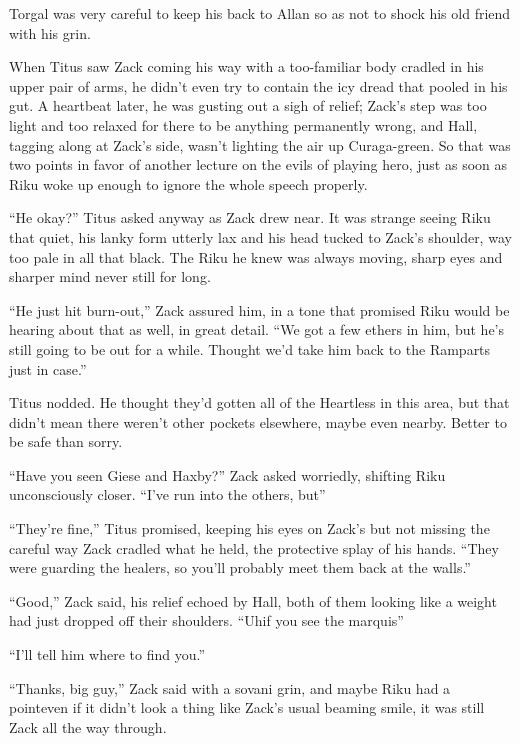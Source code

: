 Torgal was very careful to keep his back to Allan so as not to shock his old friend with his grin.


\scenechange


When Titus saw Zack coming his way with a too-familiar body cradled in his upper pair of arms, he didn't even try to contain the icy dread that pooled in his gut. A heartbeat later, he was gusting out a sigh of relief; Zack's step was too light and too relaxed for there to be anything permanently wrong, and Hall, tagging along at Zack's side, wasn't lighting the air up Curaga-green. So that was two points in favor of another lecture on the evils of playing hero, just as soon as Riku woke up enough to ignore the whole speech properly.

``He okay?'' Titus asked anyway as Zack drew near. It was strange seeing Riku that quiet, his lanky form utterly lax and his head tucked to Zack's shoulder, way too pale in all that black. The Riku he knew was always moving, sharp eyes and sharper mind never still for long.

``He just hit burn-out,'' Zack assured him, in a tone that promised Riku would be hearing about that as well, in great detail. ``We got a few ethers in him, but he's still going to be out for a while. Thought we'd take him back to the Ramparts just in case.''

Titus nodded. He thought they'd gotten all of the Heartless in this area, but that didn't mean there weren't other pockets elsewhere, maybe even nearby. Better to be safe than sorry.

``Have you seen Giese and Haxby?'' Zack asked worriedly, shifting Riku unconsciously closer. ``I've run into the others, but\textemdash ''

``They're fine,'' Titus promised, keeping his eyes on Zack's but not missing the careful way Zack cradled what he held, the protective splay of his hands. ``They were guarding the healers, so you'll probably meet them back at the walls.''

``Good,'' Zack said, his relief echoed by Hall, both of them looking like a weight had just dropped off their shoulders. ``Uh\textemdash if you see the marquis\textemdash ''

``I'll tell him where to find you.''

``Thanks, big guy,'' Zack said with a sovani grin, and maybe Riku had a point\textemdash even if it didn't look a thing like Zack's usual beaming smile, it was still Zack all the way through.

